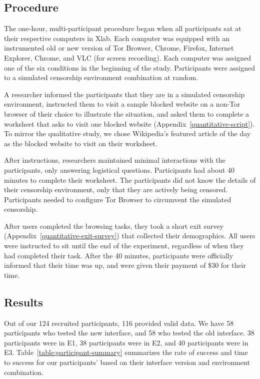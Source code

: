 \documentclass[USenglish,oneside,twocolumn]{article}
\begin{document}
\subsection{Procedure}
The one-hour, multi-participant procedure began when all participants sat at their
respective computers in Xlab. Each computer was equipped with an instrumented old or new version
of Tor Browser, Chrome, Firefox, Internet Explorer,  Chrome, and VLC (for screen recording).
Each computer was assigned one of the six conditions in the beginning of the study. Participants
were assigned to a simulated censorship environment combination at random. 

A researcher informed the participants that they are in a
simulated censorship environment, instructed them to visit a sample blocked website on a 
non-Tor browser of their choice to illustrate the situation, and asked them to 
complete a worksheet that asks to visit one blocked website (Appendix~\ref{quantitative-script}). 
To mirror the qualitative study, we chose Wikipedia's featured article of the day 
as the blocked website to visit on their worksheet. 

After instructions, researchers maintained minimal interactions with the participants, 
only answering logistical questions. Participants had
about 40 minutes to complete their worksheet.
The participants did not know the details of their censorship environment,
only that they are actively being censored. Participants needed to configure Tor Browser to 
circumvent the simulated censorship. 

After users completed the browsing tasks, they took a short exit survey (Appendix~\ref{quantitative-exit-survey})
that collected their demographics. All users were instructed to sit until the end of the experiment,
regardless of when they had completed their task. After the 40 minutes, 
participants were officially informed that their time was up, and were given their payment of 
\$30 for their time. 

\subsection{Results} 
Out of our 124 recruited participants, 116 provided valid data. We have 58 participants who tested the new interface, and 58 who tested the old interface. 38 participants were in E1, 38 participants were in E2, and 40 participants were in E3.
Table~\ref{table:participant-summary} summarizes the rate of success and time to success for our participants' based on their interface version and environment combination. 
\end{document}

